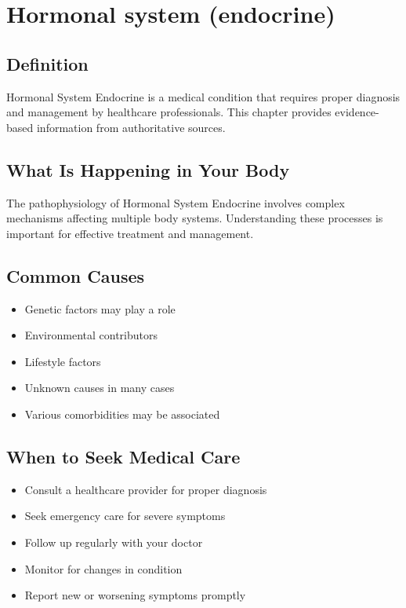 
\chapter{Hormonal system (endocrine)}

\section*{Definition}
Hormonal System Endocrine is a medical condition that requires proper diagnosis and management by healthcare professionals. This chapter provides evidence-based information from authoritative sources.

\section*{What Is Happening in Your Body}
The pathophysiology of Hormonal System Endocrine involves complex mechanisms affecting multiple body systems. Understanding these processes is important for effective treatment and management.

\section*{Common Causes}
\begin{itemize}
  \item Genetic factors may play a role
  \item Environmental contributors
  \item Lifestyle factors
  \item Unknown causes in many cases
  \item Various comorbidities may be associated
\end{itemize}

\section*{When to Seek Medical Care}
\begin{itemize}
  \item Consult a healthcare provider for proper diagnosis
  \item Seek emergency care for severe symptoms
  \item Follow up regularly with your doctor
  \item Monitor for changes in condition
  \item Report new or worsening symptoms promptly
\end{itemize}

